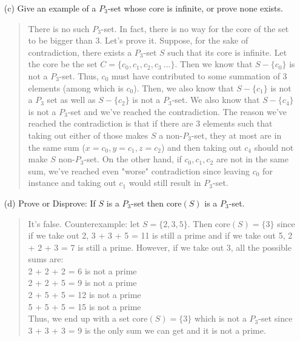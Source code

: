 \documentclass[12pt, a4paper]{article}                      %
\begin{document}
\begin{itemize}
\begin{itemize}
\item[]

\item[(c)]
Give an example of a $P_3$-set whose core is infinite, or prove none exists.
\begin{quote}
There is no such $P_3$-set. In fact, there is no way for the core of the set to be bigger than 3.
Let's prove it. Suppose, for the sake of contradiction, there exists a $P_3$-set $S$ such that its core is infinite. Let the core be the set $C = \{c_0, c_1, c_2, c_3 \ ...\}$.
Then we know that $S - \{c_0\}$ is not a $P_3$-set. Thus, $c_0$ must have contributed
to some summation of 3 elements (among which is $c_0$). Then, we also know that $S - \{c_1\}$
is not a $P_3$ set as well as $S - \{c_2\}$ is not a $P_3$-set. We also know that $S - \{c_4\}$
is not a $P_3$-set and we've reached the contradiction. The reason we've reached the contradiction
is that if there are 3 elements such that taking out either of those makes $S$ a non-$P_3$-set,
they at most are in the same sum ($x = c_0, y = c_1, z = c_2$) and then taking out $c_4$ should not
make $S$ non-$P_3$-set. On the other hand, if $c_0, c_1, c_2$ are not in the same sum, we've reached
even "worse" contradiction since leaving $c_0$ for instance and taking out $c_1$ would still
result in $P_3$-set.
\end{quote}

\item[]

\item[(d)]
Prove or Disprove: If $S$ is a $P_3$-set then core$(S)$ is a $P_3$-set. 
\begin{quote}
It's false. Counterexample: let $S = \{2, 3, 5\}$. Then core$(S) = \{3\}$ since if we take out 2, 3 + 3 + 5 = 11 is still a prime and if we take out 5, 2 + 2 + 3 = 7 is still a prime. However, if we take out 3, all the possible sums are:\\
2 + 2 + 2 = 6 is not a prime\\
2 + 2 + 5 = 9 is not a prime\\
2 + 5 + 5 = 12 is not a prime\\
5 + 5 + 5 = 15 is not a prime\\

Thus, we end up with a set core$(S) = \{3\}$ which is not a $P_3$-set since 3 + 3 + 3 = 9 is the only sum we can get and it is not a prime.
\end{quote}

\item[]


\end{itemize}
\end{itemize}
\end{document}

